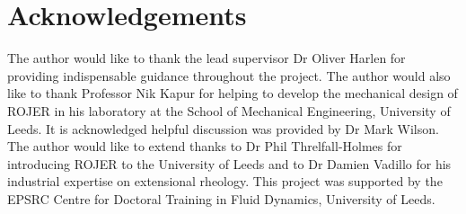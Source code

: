 \documentclass[11pt]{article}
\begin{document}
\section{Acknowledgements}
The author would like to thank the lead supervisor Dr Oliver Harlen for providing indispensable guidance throughout the project. The author would also like to thank Professor Nik Kapur for helping to develop the mechanical design of ROJER in his laboratory at the School of Mechanical Engineering, University of Leeds. It is acknowledged helpful discussion was provided by Dr Mark Wilson. The author would like to extend thanks to Dr Phil Threlfall-Holmes for introducing ROJER to the University of Leeds and to Dr Damien Vadillo for his industrial expertise on extensional rheology. This project was supported by the EPSRC Centre for Doctoral Training in Fluid Dynamics, University of Leeds.

\newpage



\end{document}
